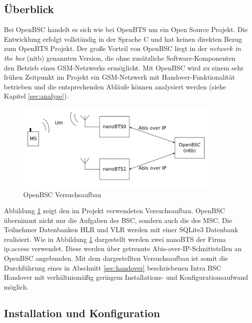 \label{sec:openbsc}

\subsection{Überblick}

Bei OpenBSC handelt es sich wie bei OpenBTS um ein Open Source Projekt. Die Entwicklung erfolgt vollständig in der Sprache C und hat keinen direkten Bezug zum OpenBTS Projekt. Der große Vorteil von OpenBSC liegt in der \textit{network in the box} (nitb) genannten Version, die ohne zusätzliche Software-Komponenten den Betrieb eines GSM-Netzwerks ermöglicht. Mit OpenBSC wird zu einem sehr frühen Zeitpunkt im Projekt ein GSM-Netzwerk mit Handover-Funktionalität betrieben und die entsprechenden Abläufe können analysiert werden (siehe Kapitel \ref{sec:analyse}).

\begin{figure}[h!]
  \centering
  \includegraphics[width=0.9\textwidth]{img/openbscarch}
  \caption{OpenBSC Versuchsaufbau}
  \label{fig:openbscarch}
\end{figure}

Abbildung \ref{fig:openbscarch} zeigt den im Projekt verwendeten Versuchsaufbau. OpenBSC übernimmt nicht nur die Aufgaben des BSC, sondern auch die des MSC. Die Teilnehmer Datenbanken HLR und VLR werden mit einer SQLite3 Datenbank realisiert. Wie in Abbildung \ref{fig:openbscarch} dargestellt werden zwei nanoBTS der Firma ip.access verwendet. Diese werden über getrennte Abis-over-IP-Schnittstellen an OpenBSC angebunden. Mit dem dargestellten Versuchsaufbau ist somit die Durchführung eines in Abschnitt \ref{sec:handover} beschriebenen Intra BSC Handover mit verhältnismäßig geringem Installations- und Konfigurationsaufwand möglich.

\subsection{Installation und Konfiguration}

